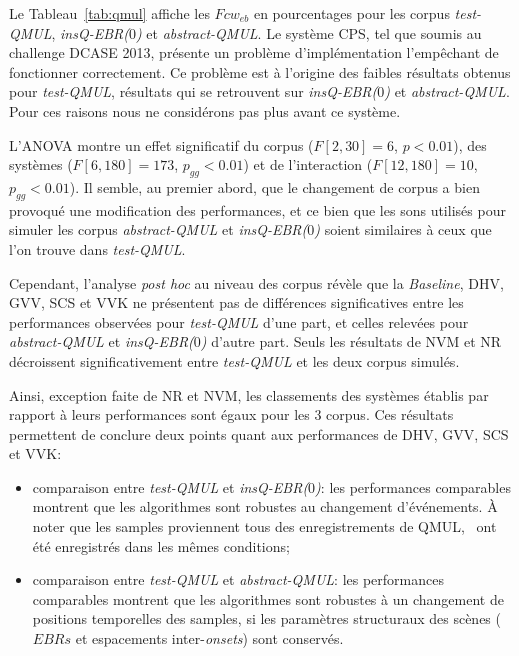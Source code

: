 
Le Tableau~\ref{tab:qmul} affiche les $Fcw_{eb}$ en pourcentages pour les corpus \emph{test-QMUL}, \emph{insQ-EBR($0$)} et \emph{abstract-QMUL}. Le système CPS, tel que soumis au challenge DCASE 2013, présente un problème d'implémentation l'empêchant de fonctionner correctement. Ce problème est à l'origine des faibles résultats obtenus pour \emph{test-QMUL}, résultats qui se retrouvent sur \emph{insQ-EBR($0$)} et \emph{abstract-QMUL}. Pour ces raisons nous ne considérons pas plus avant ce système.

L'ANOVA montre un effet significatif du corpus ($F[2,30]=6$, $p<0.01$), des systèmes ($F[6,180]=173$, $p_{gg}<0.01$) et de l'interaction ($F[12,180]=10$, $p_{gg}<0.01$). Il semble, au premier abord, que le changement de corpus a bien provoqué une modification des performances, et ce bien que les sons utilisés pour simuler les corpus \emph{abstract-QMUL} et \emph{insQ-EBR($0$)} soient similaires à ceux que l'on trouve dans \emph{test-QMUL}.

Cependant, l'analyse \emph{post hoc} au niveau des corpus révèle que la \emph{Baseline}, DHV, GVV, SCS et VVK ne présentent pas de différences significatives entre les performances observées pour \emph{test-QMUL} d'une part, et celles relevées pour \emph{abstract-QMUL} et \emph{insQ-EBR($0$)} d'autre part. Seuls les résultats de NVM et NR décroissent significativement entre \emph{test-QMUL} et les deux corpus simulés.

Ainsi, exception faite de NR et NVM, les classements des systèmes établis par rapport à leurs performances sont égaux pour les 3 corpus. Ces résultats permettent de conclure deux points quant aux performances de DHV, GVV, SCS et VVK:

\begin{itemize}
\item comparaison entre \emph{test-QMUL} et \emph{insQ-EBR($0$)}: les performances comparables montrent que les algorithmes sont robustes au changement d'événements. À noter que les samples proviennent tous des enregistrements de QMUL, \ie~ont été enregistrés dans les mêmes conditions;
\item comparaison entre \emph{test-QMUL} et \emph{abstract-QMUL}: les performances comparables montrent que les algorithmes sont robustes à un changement de positions temporelles des samples, si les paramètres structuraux des scènes ($EBRs$ et espacements inter-\emph{onsets}) sont conservés.
\end{itemize}
  
